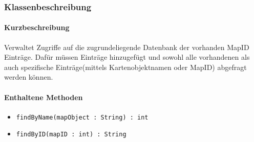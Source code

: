 \subsubsection*{Klassenbeschreibung}%
\paragraph*{Kurzbeschreibung}
Verwaltet Zugriffe auf die zugrundeliegende Datenbank der vorhanden MapID Einträge.
Dafür müssen Einträge hinzugefügt und sowohl alle vorhandenen als auch spezifische Einträge(mittels Kartenobjektnamen oder MapID) 
abgefragt werden können.
\paragraph*{Enthaltene Methoden}
\begin{itemize}
    \item \texttt{findByName(mapObject : String) : int}
    \item \texttt{findByID(mapID : int) : String}
\end{itemize}
